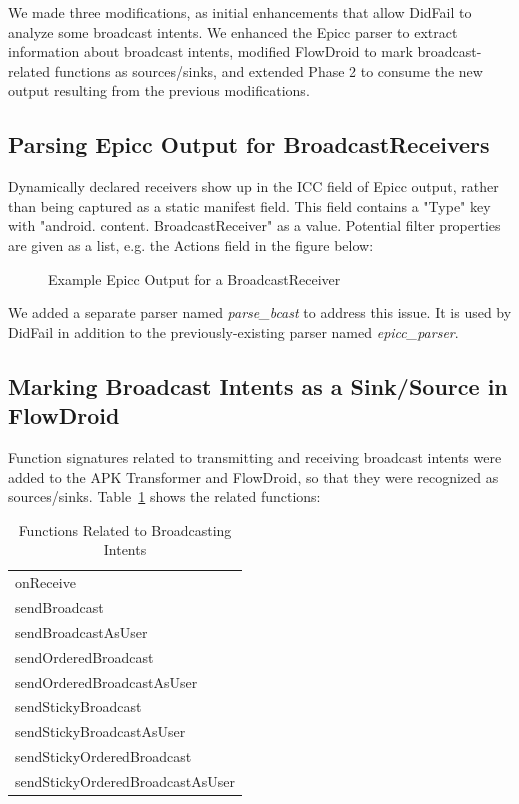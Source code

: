 We made three modifications, as initial enhancements that allow DidFail to analyze some broadcast intents. We enhanced the Epicc parser to extract information about broadcast intents, modified FlowDroid to mark broadcast-related functions as sources/sinks, and extended Phase 2 to consume the new output resulting from the previous modifications.

\subsection{Parsing Epicc Output for BroadcastReceivers}
Dynamically declared receivers show up in the ICC field of Epicc output, rather than being captured as a static manifest field.   This field contains a "Type" key with "android. content. BroadcastReceiver" as a value.  Potential filter properties are given as a list, e.g. the Actions field in the figure below:

\begin{figure}[!h]

\caption{Example Epicc Output for a BroadcastReceiver}
\end{figure}

We added a separate parser named \emph{parse\_bcast} to address this issue. It is used by DidFail in addition to the previously-existing parser named \emph{epicc\_parser}.

\subsection{Marking Broadcast Intents as a Sink/Source in FlowDroid}
Function signatures related to transmitting and receiving broadcast intents were added to the APK Transformer and FlowDroid, so that they were recognized as sources/sinks. Table~\ref{fnc_bcast} shows the related functions:
\begin{table}[!h]
\renewcommand{\arraystretch}{1.3}
\caption{Functions Related to Broadcasting Intents}
\label{fnc_bcast}
\centering
\begin{tabular}{l}
\hline
onReceive \\
sendBroadcast \\
sendBroadcastAsUser \\
sendOrderedBroadcast \\
sendOrderedBroadcastAsUser \\
sendStickyBroadcast \\
sendStickyBroadcastAsUser \\
sendStickyOrderedBroadcast \\
sendStickyOrderedBroadcastAsUser \\
\hline
\end{tabular}
\end{table}

